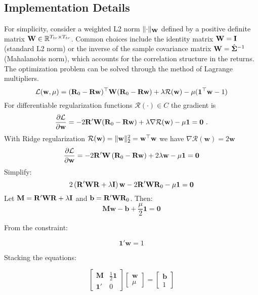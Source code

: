 \subsection{Implementation Details}
For simplicity, consider a weighted L2 norm $\lVert\cdot\rVert_{\mathbf W}$ defined by a positive definite matrix $\mathbf W\in\mathbb{R}^{T_{tr}\times T_{tr}}$. Common choices include the identity matrix $\mathbf W = \mathbf I$ (standard L2 norm) or the inverse of the sample covariance matrix $\mathbf W = \hat{\boldsymbol\Sigma}^{-1}$ (Mahalanobis norm), which accounts for the correlation structure in the returns.
The optimization problem can be solved through the method of Lagrange multipliers. 
$$
\mathcal{L}(\mathbf{w}, \mu) 
= 
(
\mathbf R_0 - \mathbf R \mathbf{w} 
)^\top 
\mathbf{W} 
( \mathbf R_0 - \mathbf R \mathbf{w} 
) 
+ 
\lambda \mathcal{R}(\mathbf{w}) 
- 
\mu 
( \mathbf 1^\top \mathbf w - 1)
$$
For differentiable regularization functions $\mathcal R(\cdot)\in C$ the gradient is
$$
\frac{\partial \mathcal L}{\partial \mathbf w} =
-2 \mathbf R' \mathbf{W} ( \mathbf R_0 - \mathbf R \mathbf{w} ) + \lambda \nabla \mathcal{R}(\mathbf{w}) - \mu \mathbf{1} = \mathbf{0}
~.
$$
With Ridge regularization $ \mathcal{R}(\mathbf{w}) = \| \mathbf{w} \|_2^2 =\mathbf w^\top\mathbf w$ we have $\nabla \mathcal{R}(\mathbf{w}) = 2 \mathbf{w}$
$$
\frac{\partial \mathcal L}{\partial \mathbf w} =
-2 \mathbf R' \mathbf{W} \left( \mathbf R_0 - \mathbf R \mathbf{w} \right) + 2 \lambda \mathbf{w} - \mu \mathbf{1} = \mathbf{0}
$$
Simplify:
$$
2 \left( \mathbf R' \mathbf{W} \mathbf R + \lambda \mathbf{I} \right) \mathbf{w} - 2 \mathbf R' \mathbf{W} \mathbf R_0 - \mu \mathbf{1} = \mathbf{0}
$$
Let $ \mathbf{M} = \mathbf R' \mathbf{W} \mathbf R + \lambda \mathbf{I} $ and $ \mathbf{b} = \mathbf R' \mathbf{W} \mathbf R_0 $. Then:
$$
\mathbf{M} \mathbf{w} - \mathbf{b} + \frac{\mu}{2} \mathbf{1} = \mathbf{0}
$$

From the constraint:

$$
\mathbf{1}' \mathbf{w} = 1
$$

Stacking the equations:

$$
\begin{bmatrix}
\mathbf{M} & \frac{1}{2} \mathbf{1} \\
\mathbf{1}' & 0
\end{bmatrix}
\begin{bmatrix}
\mathbf{w} \\
\mu
\end{bmatrix}
=
\begin{bmatrix}
\mathbf{b} \\
1
\end{bmatrix}
$$

